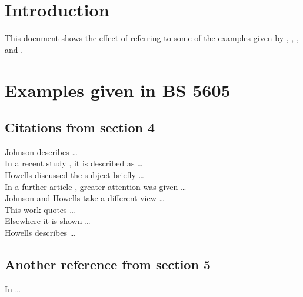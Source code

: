 
 
\raggedright
 

 
%
\chapter{Introduction}
 
This document shows the effect of referring to some of the examples given
by \cite{bs-1629}, \cite{bs-5605}, \cite{bs-6371}, \cite{butcher-81} and
\cite{chicago-82}.
 
\chapter{Examples given in BS 5605}
 
\section{Citations from section 4}
 
%
Johnson  describes \dots\\
In a recent study \cite{johnson-74}, it is described as \dots\\
%
Howells  discussed the subject briefly \dots\\
%
In a further article \cite{howells-66-var}, greater attention was
given \dots\\
%
Johnson and Howells  take a different view \dots\\
%
This work \cite{johnson-etc} quotes \dots\\
%
Elsewhere \cite{anon-67} it is shown \dots\\
%
Howells  describes \dots\\
 
\section{Another reference from section 5}
 
In \cite{howells-51} \dots\\
 
